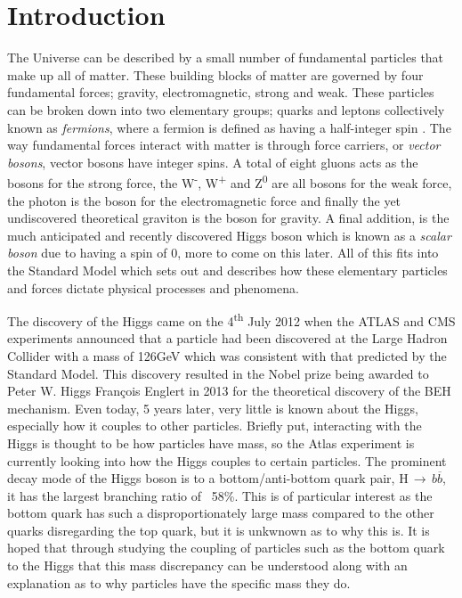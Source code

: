 \chapter{Introduction}
The Universe can be described by a small number of fundamental particles that make up all of matter. These building blocks of matter are governed by four fundamental forces; gravity, electromagnetic, strong and weak. These particles can be broken down into two elementary groups; quarks and leptons collectively known as  \textit{fermions}, where a fermion is defined as having a half-integer spin . The way fundamental forces interact with matter is through force carriers, or \textit{vector bosons}, vector bosons have integer spins. A total of eight gluons acts as the bosons for the strong force, the W\textsuperscript{-}, W\textsuperscript{+} and Z\textsuperscript{0} are all bosons for the weak force, the photon is the boson for the electromagnetic force and finally the yet undiscovered theoretical graviton is the boson for gravity. A final addition, is the much anticipated and recently discovered Higgs boson which is known as a \textit{scalar boson} due to having a spin of 0\cite{Braibant:2012vky}, more to come on this later. All of this fits into the Standard Model which sets out and describes how these elementary particles and forces dictate physical processes and phenomena. 

The discovery of the Higgs came on the 4\textsuperscript{th} July 2012 when the ATLAS and CMS experiments announced that a particle had been discovered at the Large Hadron Collider with a mass of 126GeV which was consistent with that predicted by the Standard Model\cite{Higgs:1998491}. This discovery resulted in the Nobel prize being awarded to Peter W. Higgs François Englert in 2013 for the theoretical discovery of the BEH mechanism.  Even today, 5 years later, very little is known about the Higgs, especially how it couples to other particles. Briefly put, interacting with the Higgs  is thought to be how particles have mass, so the Atlas experiment is currently looking into how the Higgs couples to certain particles. The prominent decay mode of the Higgs boson is to a bottom/anti-bottom quark pair, H$\,\to\,b\overline{b}$, it has the largest branching ratio of ~58\%\cite{Djouadi:1997yw}. This is of particular interest as the bottom quark has such a disproportionately large mass compared to the other quarks disregarding the top quark, but it is unkwnown as to why this is. It is hoped that through  studying the coupling of particles such as the bottom quark to the Higgs that this mass discrepancy can be understood along with an explanation as to why particles have the specific mass they do.

